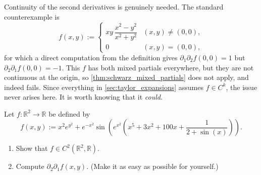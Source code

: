\begin{remark}
\label{rem:schwarz_needs_c2}
Continuity of the second derivatives is genuinely needed. The standard counterexample is
\[f(x,y) := \begin{cases} xy\,\dfrac{x^2-y^2}{x^2+y^2} & (x,y)\neq(0,0), \\[1ex]
  0 & (x,y)=(0,0),\end{cases}\]
for which a direct computation from the definition gives
$\partial_1\partial_2 f(0,0) = 1$ but $\partial_2\partial_1 f(0,0) = -1$. This $f$ has both
mixed partials everywhere, but they are not continuous at the origin, so
\cref{thm:schwarz_mixed_partials} does not apply, and indeed fails. Since everything in
\cref{sec:taylor_expansions} assumes $f \in C^k$, the issue never arises here. It is worth
knowing that it \emph{could}.
\end{remark}

\begin{exercise}
\label{ex:schwarz_application}
Let $f : \mathbb{R}^2 \to \mathbb{R}$ be defined by
\[f(x,y) := x^2 e^{y^2} + e^{-x^2} \sin\left(e^{x^2} \left(x^5 + 3x^2 + 100x + \frac{1}{2+\sin(x)}\right)\right).\]
\begin{enumerate}[label=\textbf{(\alph*)}]
  \item Show that $f \in C^2(\mathbb{R}^2, \mathbb{R})$.
  \item Compute $\partial_2 \partial_1 f(x,y)$. (Make it as easy as possible for yourself.)
\end{enumerate}
\end{exercise}


